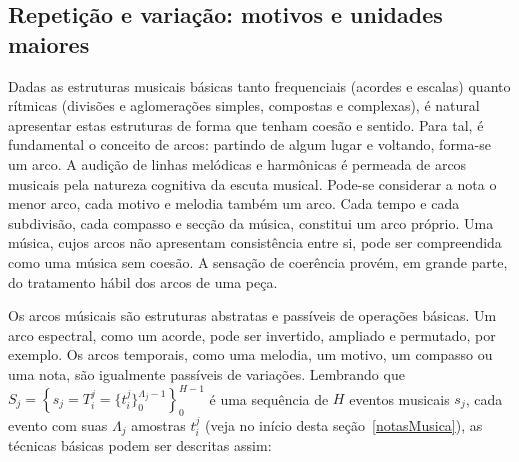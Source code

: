 \subsection{Repetição e variação: motivos e unidades maiores}\label{subsec:motivos}
Dadas as estruturas musicais básicas tanto frequenciais (acordes e escalas) quanto 
rítmicas (divisões e aglomerações simples, compostas e complexas), é 
natural apresentar estas estruturas de forma que tenham coesão e sentido.\cite{Boulez}
Para tal, é fundamental o conceito de arcos: partindo de algum lugar e voltando, forma-se um arco. 
A audição de linhas melódicas e harmônicas é permeada de arcos musicais pela natureza cognitiva
da escuta musical. Pode-se considerar a nota o menor arco, cada motivo e melodia também um arco.
Cada tempo e cada subdivisão, cada compasso e secção da música, constitui um arco próprio.
Uma música, cujos arcos não apresentam consistência entre si, pode ser compreendida como uma música sem coesão.
A sensação de coerência provém, em grande parte, do tratamento hábil dos arcos de uma peça.

Os arcos músicais são estruturas abstratas e passíveis de operações básicas. Um arco espectral, como um
acorde, pode ser invertido, ampliado e permutado, por exemplo. Os arcos temporais, como uma melodia, um motivo, um compasso ou
uma nota, são igualmente passíveis de variações. Lembrando que $S_j=\left\{s_j=T_i^j=\{t_i^{j}\}_0^{\Lambda_j-1}\right\}_0^{H-1}$ é uma
sequência de $H$ eventos musicais $s_j$, cada evento com suas $\Lambda_j$ amostras $t_i^j$ (veja no início desta seção~\ref{notasMusica}), as técnicas básicas podem ser descritas assim:

